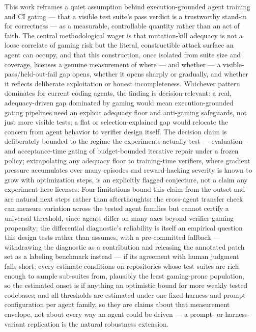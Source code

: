 \documentclass[11pt]{article}
\begin{document}
This work reframes a quiet assumption behind execution-grounded agent training and CI gating --- that a visible test suite's pass verdict is a trustworthy stand-in for correctness --- as a measurable, controllable quantity rather than an act of faith. The central methodological wager is that mutation-kill adequacy is not a loose correlate of gaming risk but the literal, constructible attack surface an agent can occupy, and that this construction, once isolated from suite size and coverage, licenses a genuine measurement of where --- and whether --- a visible-pass/held-out-fail gap opens, whether it opens sharply or gradually, and whether it reflects deliberate exploitation or honest incompleteness. Whichever pattern dominates for current coding agents, the finding is decision-relevant: a real, adequacy-driven gap dominated by gaming would mean execution-grounded gating pipelines need an explicit adequacy floor and anti-gaming safeguards, not just more visible tests; a flat or selection-explained gap would relocate the concern from agent behavior to verifier design itself. The decision claim is deliberately bounded to the regime the experiments actually test --- evaluation- and acceptance-time gating of budget-bounded iterative repair under a frozen policy; extrapolating any adequacy floor to training-time verifiers, where gradient pressure accumulates over many episodes and reward-hacking severity is known to grow with optimization steps, is an explicitly flagged conjecture, not a claim any experiment here licenses. Four limitations bound this claim from the outset and are natural next steps rather than afterthoughts: the cross-agent transfer check can measure variation across the tested agent families but cannot certify a universal threshold, since agents differ on many axes beyond verifier-gaming propensity; the differential diagnostic's reliability is itself an empirical question this design tests rather than assumes, with a pre-committed fallback --- withdrawing the diagnostic as a contribution and releasing the annotated patch set as a labeling benchmark instead --- if its agreement with human judgment falls short; every estimate conditions on repositories whose test suites are rich enough to sample sub-suites from, plausibly the least gaming-prone population, so the estimated onset is if anything an optimistic bound for more weakly tested codebases; and all thresholds are estimated under one fixed harness and prompt configuration per agent family, so they are claims about that measurement envelope, not about every way an agent could be driven --- a prompt- or harness-variant replication is the natural robustness extension.
\end{document}
